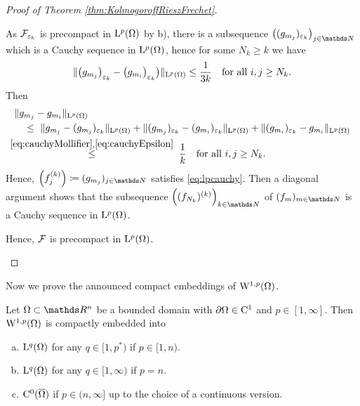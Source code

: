 \begin{proof}[Proof of Theorem \ref{thm:KolmogoroffRieszFrechet}]
\begin{enumerate}[I)]
\begin{enumerate}[a)]
\begin{equation}
        \end{equation}
        As $\mathcal{F}_{\varepsilon_k}$ is precompact in $\mathrm{L}^p(\Omega)$ by b), there is a subsequence $\big((g_{m_j})_{\varepsilon_k}\big)_{j \in \N}$ which is a Cauchy sequence in $\mathrm{L}^p(\Omega)$, hence for some $N_k \geq k$ we have
        \begin{equation}
          \label{eq:cauchyEpsilon}
          \| \big( g_{m_j} \big)_{\varepsilon_k} - \big( g_{m_i} \big)_{\varepsilon_k} \big) \|_{\mathrm{L}^p(\Omega)} \leq \frac{1}{3k} \quad\text{for all } i,j \geq N_k.
        \end{equation}
        Then
        \begin{align*}
          &\|g_{m_j} - g_{m_i}\|_{\mathrm{L}^p(\Omega)} \\
          &\quad \leq \
          \|g_{m_j} - (g_{m_j})_{\varepsilon_k} \|_{\mathrm{L}^p(\Omega)}
          + \|(g_{m_j})_{\varepsilon_k} - (g_{m_i})_{\varepsilon_k} \|_{\mathrm{L}^p(\Omega)}
          + \|(g_{m_i})_{\varepsilon_k} - g_{m_i} \|_{\mathrm{L}^p(\Omega)} \\
          &\hspace{-1.7em}\quad\overset{\eqref{eq:cauchyMollifier},\eqref{eq:cauchyEpsilon}}\leq \; \frac{1}{k} \quad\text{for all } i,j \geq N_k.
        \end{align*}
        Hence, $\Big( f_j^{(k)} \Big) \coloneqq (g_{m_j})_{j \in \N}$ satisfies \eqref{eq:lpcauchy}.
        Then a diagonal argument shows that the subsequence $\Big((f_{N_k})^{(k)} \Big)_{k \in \N}$ of $(f_m)_{m \in \N}$ is a Cauchy sequence in $\mathrm{L}^p(\Omega)$.

        Hence, $\mathcal{F}$ is precompact in $\mathrm{L}^p(\Omega)$. \qedhere
    \end{enumerate}
  \end{enumerate}
\end{proof}

Now we prove the announced compact embeddings of $\mathrm{W}^{1,p}(\Omega)$.

\begin{thm}
  \label{thm:RellichKondrachov}
  Let $\Omega \subset \R^n$ be a bounded domain with $\partial\Omega \in \mathrm{C}^1$ and $p \in [1,\infty]$.
  Then $\mathrm{W}^{1,p}(\Omega)$ is compactly embedded into
  \begin{enumerate}[a)]
    \item $\mathrm{L}^q(\Omega)$ for any $q \in [1,p^*)$ if $p \in [1,n)$.
    \item $\mathrm{L}^q(\Omega)$ for any $q \in [1,\infty)$ if $p = n$.
    \item $\mathrm{C}^0(\overline\Omega)$ if $p \in (n,\infty]$ up to the choice of a continuous version.
  \end{enumerate}
\end{thm}

